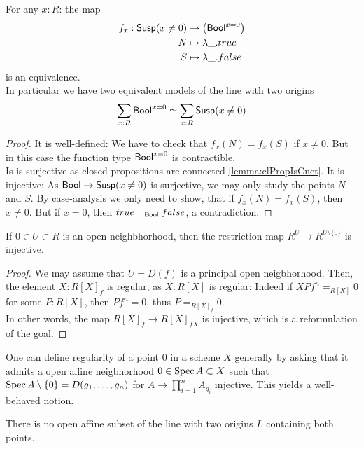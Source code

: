 \begin{lemma}{\label{lemma:X1}}
	For any $x : R$: the map
	\begin{align*}
		f_x : \mathsf{Susp}(x \neq 0) &\to \left(\mathsf{Bool}^{x = 0} \right)\\
		N &\mapsto  \lambda \_ . true \\
		S &\mapsto \lambda \_ . false \\
	\end{align*}
	is an equivalence.\\
	In particular we have two equivalent models of the line with two origins
	\[
	\sum_{x : R} \mathsf{Bool} ^{x=0} \simeq \sum_{x : R} \mathsf{Susp} (x\neq0)
	\]
\end{lemma}
\begin{proof}
	It is well-defined: We have to check that $f_x(N) = f_x(S)$ if $x \neq 0$. But in this case the function type $\mathsf{Bool}^{x=0}$ is contractible. \\
	Is is surjective as closed propositions are connected \ref{lemma:clPropIsCnct}. 
	It is injective: As $\mathsf{Bool} \to \mathsf{Susp}(x \neq 0)$ is surjective, we may only study the points $N$ and $S$. By case-analysis we only need to show, that if $f_x(N) = f_x(S)$, then $x \neq 0$. But if $x = 0$, then $true =_{\mathsf{Bool}} false$, a contradiction. 
\end{proof}
\ifsc
\begin{lemma}{\label{lemma:AlmostEverywhere}}
	If $0 \in U \subset R$ is an open neighbhorhood, then the restriction map $R^U \to R^{U \setminus \{0\}}$ is injective. 
\end{lemma}
\begin{proof}
	We may assume that $U = D(f)$ is a principal open neigbhorhood. Then, the element $X : R[X]_f$ is regular, as $X : R[X]$ is regular: Indeed if $X P f^n  =_{R[X]} 0$ for some $P : R[X]$, then $P f^n = 0$, thus $P =_{R[X]_f}  0$. \\
	In other words, the map $R[X]_f \to R[X]_{f X}$ is injective, which is a reformulation of the 	goal.
\end{proof}
\begin{rmk}
	One can define regularity of a point 0 in a scheme $X$ generally by asking that it admits a open affine neigbhorhood $0 \in \operatorname{Spec} A \subset X$ such that $\operatorname{Spec} A \setminus \{0\} = D(g_1,\hdots,g_n)$ for $A \to \prod_{i=1}^n A_{g_i}$ injective. This yields a well-behaved notion. \cite{geomstacks}
\end{rmk}
\fi
\begin{lemma}{\label{lemma:noAffNbhd}}
	There is no open affine subset of the line with two origins $L$ containing both points.
\end{lemma}
